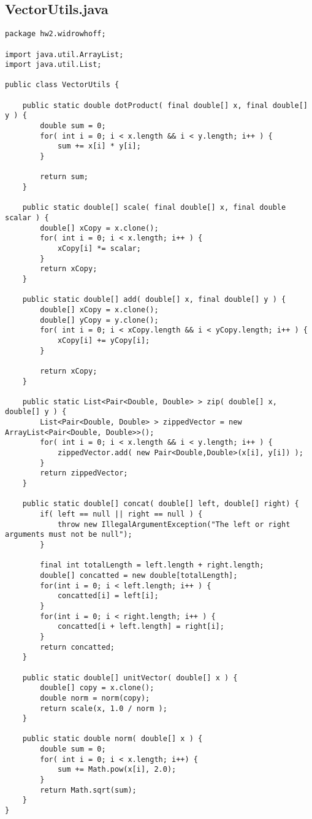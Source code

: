 \subsection{VectorUtils.java}
\begin{lstlisting}
package hw2.widrowhoff;

import java.util.ArrayList;
import java.util.List;

public class VectorUtils {
	
	public static double dotProduct( final double[] x, final double[] y ) {
		double sum = 0;
		for( int i = 0; i < x.length && i < y.length; i++ ) {
			sum += x[i] * y[i];
		}
		
		return sum;
	}
	
	public static double[] scale( final double[] x, final double scalar ) {
		double[] xCopy = x.clone();
		for( int i = 0; i < x.length; i++ ) {
			xCopy[i] *= scalar;
		}
		return xCopy;
	}
	
	public static double[] add( double[] x, final double[] y ) {
		double[] xCopy = x.clone();
		double[] yCopy = y.clone();
		for( int i = 0; i < xCopy.length && i < yCopy.length; i++ ) {
			xCopy[i] += yCopy[i];
		}
		
		return xCopy;
	}
	
	public static List<Pair<Double, Double> > zip( double[] x, double[] y ) {
		List<Pair<Double, Double> > zippedVector = new ArrayList<Pair<Double, Double>>();
		for( int i = 0; i < x.length && i < y.length; i++ ) {
			zippedVector.add( new Pair<Double,Double>(x[i], y[i]) );
		}
		return zippedVector;
	}
	
	public static double[] concat( double[] left, double[] right) {
		if( left == null || right == null ) {
			throw new IllegalArgumentException("The left or right arguments must not be null");
		}
		
		final int totalLength = left.length + right.length;
		double[] concatted = new double[totalLength];
		for(int i = 0; i < left.length; i++ ) {
			concatted[i] = left[i];
		}
		for(int i = 0; i < right.length; i++ ) {
			concatted[i + left.length] = right[i];
		}
		return concatted;
	}
	
	public static double[] unitVector( double[] x ) {
		double[] copy = x.clone();
		double norm = norm(copy);
		return scale(x, 1.0 / norm );
	}
	
	public static double norm( double[] x ) {
		double sum = 0;
		for( int i = 0; i < x.length; i++) {
			sum += Math.pow(x[i], 2.0);
		}
		return Math.sqrt(sum);
	}
}
\end{lstlisting}
